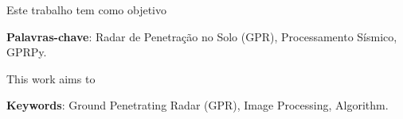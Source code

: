 

\begin{resumo}
    \noindent

    Este trabalho tem como objetivo 
    
  


    \textbf{Palavras-chave}: Radar de Penetração no Solo (GPR), Processamento Sísmico, GPRPy.
\end{resumo}


\begin{resumo}[Abstract]
    \noindent
    This work aims to 


    \textbf{Keywords}: Ground Penetrating Radar (GPR), Image Processing, Algorithm.
\end{resumo}
